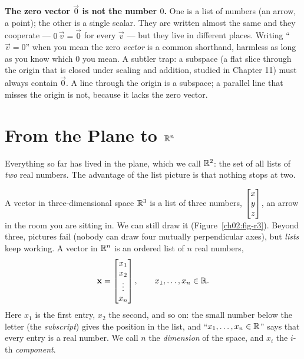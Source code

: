 \begin{trapbox}
\textbf{The zero vector $\vec{0}$ is not the number $0$.} One is a list of numbers (an
arrow, a point); the other is a single scalar. They are written almost the same and they
cooperate --- $0\,\vec{v}=\vec{0}$ for every $\vec{v}$ --- but they live in different
places. Writing ``$\vec{v}=0$'' when you mean the zero \emph{vector} is a common
shorthand, harmless as long as you know which $0$ you mean. A subtler trap: a subspace (a flat slice through
the origin that is closed under scaling and addition, studied in Chapter 11) must always
contain $\vec{0}$. A line through the origin is a subspace; a parallel line that misses
the origin is not, because it lacks the zero vector.
\end{trapbox}

\section{From the Plane to \texorpdfstring{$\mathbb{R}^n$}{Rn}}
\label{ch02:rn}

Everything so far has lived in the plane, which we call $\mathbb{R}^2$: the set of all lists of
\emph{two} real numbers. The advantage of the list picture is that nothing stops at two.

A vector in three-dimensional space $\mathbb{R}^3$ is a list of three numbers,
$\begin{bmatrix}x\\y\\z\end{bmatrix}$, an arrow in the room you are sitting in. We can still draw it
(Figure~\ref{ch02:fig-r3}). Beyond three, pictures fail (nobody can draw four mutually
perpendicular axes), but \emph{lists} keep working. A vector in $\mathbb{R}^n$ is an ordered
list of $n$ real numbers,
\[
  \mathbf{x} = \begin{bmatrix}x_1 \\ x_2 \\ \vdots \\ x_n\end{bmatrix},
  \qquad x_1,\dots,x_n \in \mathbb{R}.
\]
Here $x_1$ is the first entry, $x_2$ the second, and so on: the small number below the
letter (the \emph{subscript}) gives the position in the list, and
``$x_1,\dots,x_n\in\mathbb{R}$'' says that every entry is a real number. We call $n$ the
\emph{dimension} of the space, and $x_i$ the $i$-th \emph{component}.

